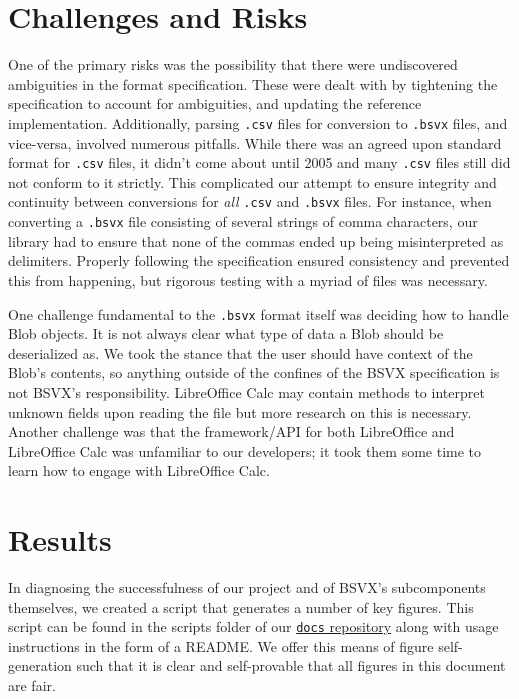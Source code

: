 \documentclass[10pt]{article}
\begin{document}
\section*{Challenges and Risks}

One of the primary risks was the possibility that there were undiscovered ambiguities in the format specification.
These were dealt with by tightening the specification to account for ambiguities, and updating the reference implementation.
Additionally, parsing \texttt{.csv} files for conversion to \texttt{.bsvx} files, and vice-versa, involved numerous pitfalls.
While there was an agreed upon standard format for \texttt{.csv} files, it didn’t come about until 2005 and many \texttt{.csv} files still did not conform to it strictly.
This complicated our attempt to ensure integrity and continuity between conversions for \textit{all} \texttt{.csv} and \texttt{.bsvx} files.
For instance, when converting a \texttt{.bsvx} file consisting of several strings of comma characters, our library had to ensure that none of the commas ended up being misinterpreted as delimiters.
Properly following the specification ensured consistency and prevented this from happening, but rigorous testing with a myriad of files was necessary.

\indent{}
One challenge fundamental to the \texttt{.bsvx} format itself was deciding how to handle Blob objects.
It is not always clear what type of data a Blob should be deserialized as.
We took the stance that the user should have context of the Blob's contents, so anything outside of the confines of the BSVX specification is not BSVX's responsibility.
LibreOffice Calc may contain methods to interpret unknown fields upon reading the file but more research on this is necessary.
Another challenge was that the framework/API for both LibreOffice and LibreOffice Calc was unfamiliar to our developers; it took them some time to learn how to engage with LibreOffice Calc.

\section*{Results}

In diagnosing the successfulness of our project and of BSVX's subcomponents themselves, we created a script that generates a number of key figures.
This script can be found in the scripts folder of our \href{https://github.com/bsvx/docs}{\texttt{docs} repository} along with usage instructions in the form of a README.
We offer this means of figure self-generation such that it is clear and self-provable that all figures in this document are fair.
\end{document}
